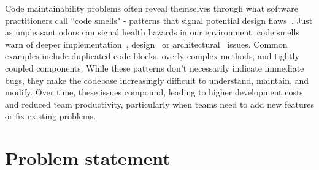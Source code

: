 Code maintainability problems often reveal themselves through what software practitioners call ``code smells" - patterns that signal potential design flaws~\cite{Fowler1999Refactoring}. Just as unpleasant odors can signal health hazards in our environment, code smells warn of deeper implementation~\cite{Fowler1999Refactoring}, design~\cite{suryanarayana2014refactoring} or architectural~\cite{garcia2009identifying} issues. Common examples include duplicated code blocks, overly complex methods, and tightly coupled components. While these patterns don't necessarily indicate immediate bugs, they make the codebase increasingly difficult to understand, maintain, and modify. Over time, these issues compound, leading to higher development costs and reduced team productivity, particularly when teams need to add new features or fix existing problems.

\section{Problem statement}




